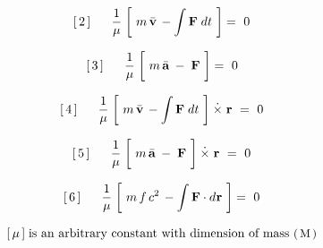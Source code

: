 \documentclass[10pt,fleqn]{article}
\begin{document}
\par \vspace{+0.15em}
\begin{eqnarray*}
\hspace{+1.17em} [\,2\,] \;\;\;\;\;\; \dfrac{1}{\mu} \; \bigg [ \,\, m \, \bar{\mathbf{v}} \, - \int \mathbf{F} \; d\hspace{+0.012em}t \,\, \bigg ] =~ 0
\end{eqnarray*}
\par \vspace{+0.15em}
\begin{eqnarray*}
\hspace{+1.17em} [\,3\,] \;\;\;\;\;\; \dfrac{1}{\mu} \; \bigg [ \,\, m \, \bar{\mathbf{a}} \: - \; \mathbf{F} \,\, \bigg ] =~ 0
\end{eqnarray*}
\par \vspace{+0.15em}
\begin{eqnarray*}
\hspace{+1.17em} [\,4\,] \;\;\;\;\;\; \dfrac{1}{\mu} \; \bigg [ \,\, m \, \bar{\mathbf{v}} \, - \int \mathbf{F} \; d\hspace{+0.012em}t \,\, \bigg ] \hspace{+0.24em}\dot{\times}\hspace{+0.30em} \mathbf{r} ~=~ 0
\end{eqnarray*}
\par \vspace{+0.15em}
\begin{eqnarray*}
\hspace{+1.17em} [\,5\,] \;\;\;\;\;\; \dfrac{1}{\mu} \; \bigg [ \,\, m \, \bar{\mathbf{a}} \: - \; \mathbf{F} \,\, \bigg ] \hspace{+0.24em}\dot{\times}\hspace{+0.30em} \mathbf{r} ~=~ 0
\end{eqnarray*}
\par \vspace{+0.15em}
\begin{eqnarray*}
\hspace{+1.17em} [\,6\,] \;\;\;\;\;\; \dfrac{1}{\mu} \; \bigg [ \,\, m \, f \, c^2 \, - \int \mathbf{F} \cdot d\hspace{+0.036em}\mathbf{r} \,\, \bigg ] =~ 0
\end{eqnarray*}
\par \vspace{+0.33em}
\begin{eqnarray*}
\hspace{+1.17em} [\,\mu\,] \; \textrm{is an arbitrary constant with dimension of mass {\small $( \, \mathrm{M} \, )$}}
\end{eqnarray*}
\end{document}
